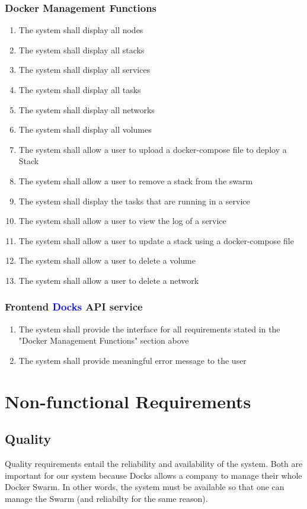 \documentclass[]{article}
\newcommand{\docks}{\textcolor{Blue}{Docks} }
\begin{document}
\subsubsection{Docker Management Functions}
\begin{enumerate}[label*=R5.\arabic*.]
	\item The system shall display all nodes
	\item The system shall display all stacks
	\item The system shall display all services
	\item The system shall display all tasks
	\item The system shall display all networks
	\item The system shall display all volumes
	\item The system shall allow a user to upload a docker-compose file to deploy a Stack
	\item The system shall allow a user to remove a stack from the swarm
	\item The system shall display the tasks that are running in a service
	\item The system shall allow a user to view the log of a service
	\item The system shall allow a user to update a stack using a docker-compose file
	\item The system shall allow a user to delete a volume
	\item The system shall allow a user to delete a network
\end{enumerate}

\subsubsection{Frontend \docks API service}
\begin{enumerate}[label*=R6.\arabic*.]
	\item The system shall provide the interface for all requirements stated in the "Docker Management Functions" section above
	\item The system shall provide meaningful error message to the user
\end{enumerate}

\section{Non-functional Requirements}
\subsection{Quality}
Quality requirements entail the reliability and availability of the system. Both are important for our system because Docks allows a company to manage their whole Docker Swarm. In other words, the system must be available so that one can manage the Swarm (and reliabilty for the same reason). 
\end{document}
